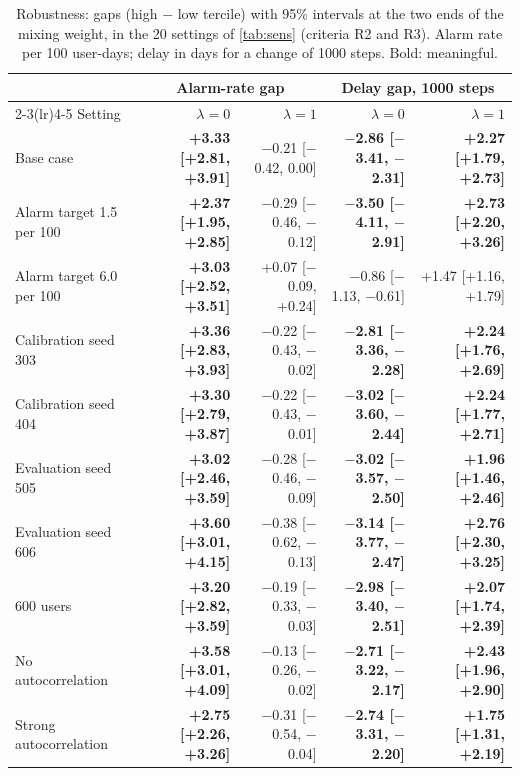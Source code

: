 \begin{table}[!htbp]
\centering
\scriptsize
\setlength{\tabcolsep}{3.0pt}
\caption{Robustness: gaps (high $-$ low tercile) with 95\% intervals at the two ends of the mixing weight, in the 20 settings of \cref{tab:sens} (criteria R2 and R3). Alarm rate per 100 user-days; delay in days for a change of 1000 steps. Bold: meaningful.}
\label{tab:sens_ci_b}
\begin{tabular}{@{}p{4.6cm}rrrr@{}}
\toprule
 & \multicolumn{2}{c}{Alarm-rate gap} & \multicolumn{2}{c}{Delay gap, 1000 steps} \\
\cmidrule(lr){2-3}\cmidrule(lr){4-5}
Setting & $\lambda=0$ & $\lambda=1$ & $\lambda=0$ & $\lambda=1$ \\
\midrule
Base case & \textbf{+3.33 [+2.81, +3.91]} & $-$0.21 [$-$0.42, 0.00] & \textbf{$-$2.86 [$-$3.41, $-$2.31]} & \textbf{+2.27 [+1.79, +2.73]} \\
Alarm target 1.5 per 100 & \textbf{+2.37 [+1.95, +2.85]} & $-$0.29 [$-$0.46, $-$0.12] & \textbf{$-$3.50 [$-$4.11, $-$2.91]} & \textbf{+2.73 [+2.20, +3.26]} \\
Alarm target 6.0 per 100 & \textbf{+3.03 [+2.52, +3.51]} & +0.07 [$-$0.09, +0.24] & $-$0.86 [$-$1.13, $-$0.61] & +1.47 [+1.16, +1.79] \\
Calibration seed 303 & \textbf{+3.36 [+2.83, +3.93]} & $-$0.22 [$-$0.43, $-$0.02] & \textbf{$-$2.81 [$-$3.36, $-$2.28]} & \textbf{+2.24 [+1.76, +2.69]} \\
Calibration seed 404 & \textbf{+3.30 [+2.79, +3.87]} & $-$0.22 [$-$0.43, $-$0.01] & \textbf{$-$3.02 [$-$3.60, $-$2.44]} & \textbf{+2.24 [+1.77, +2.71]} \\
Evaluation seed 505 & \textbf{+3.02 [+2.46, +3.59]} & $-$0.28 [$-$0.46, $-$0.09] & \textbf{$-$3.02 [$-$3.57, $-$2.50]} & \textbf{+1.96 [+1.46, +2.46]} \\
Evaluation seed 606 & \textbf{+3.60 [+3.01, +4.15]} & $-$0.38 [$-$0.62, $-$0.13] & \textbf{$-$3.14 [$-$3.77, $-$2.47]} & \textbf{+2.76 [+2.30, +3.25]} \\
600 users & \textbf{+3.20 [+2.82, +3.59]} & $-$0.19 [$-$0.33, $-$0.03] & \textbf{$-$2.98 [$-$3.40, $-$2.51]} & \textbf{+2.07 [+1.74, +2.39]} \\
No autocorrelation & \textbf{+3.58 [+3.01, +4.09]} & $-$0.13 [$-$0.26, $-$0.02] & \textbf{$-$2.71 [$-$3.22, $-$2.17]} & \textbf{+2.43 [+1.96, +2.90]} \\
Strong autocorrelation & \textbf{+2.75 [+2.26, +3.26]} & $-$0.31 [$-$0.54, $-$0.04] & \textbf{$-$2.74 [$-$3.31, $-$2.20]} & \textbf{+1.75 [+1.31, +2.19]} \\

\end{tabular}
\end{table}
